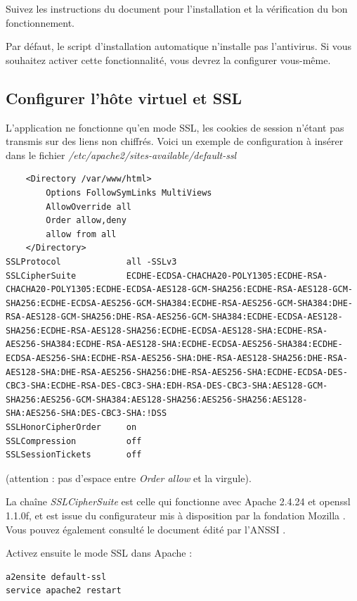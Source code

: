 Suivez les instructions du document \cite{clamavarchlinux} pour l'installation et la vérification du bon fonctionnement.

Par défaut, le script d'installation automatique n'installe pas l'antivirus. Si vous souhaitez activer cette fonctionnalité, vous devrez la configurer vous-même.

\subsection{Configurer l'hôte virtuel et SSL}
L'application ne fonctionne qu'en mode SSL, les cookies de session n'étant pas transmis sur des liens non chiffrés. Voici un exemple de configuration à insérer dans le fichier \textit{/etc/apache2/sites-available/default-ssl}
\begin{lstlisting}
    <Directory /var/www/html>
        Options FollowSymLinks MultiViews
        AllowOverride all
        Order allow,deny
        allow from all
    </Directory>
SSLProtocol             all -SSLv3
SSLCipherSuite          ECDHE-ECDSA-CHACHA20-POLY1305:ECDHE-RSA-CHACHA20-POLY1305:ECDHE-ECDSA-AES128-GCM-SHA256:ECDHE-RSA-AES128-GCM-SHA256:ECDHE-ECDSA-AES256-GCM-SHA384:ECDHE-RSA-AES256-GCM-SHA384:DHE-RSA-AES128-GCM-SHA256:DHE-RSA-AES256-GCM-SHA384:ECDHE-ECDSA-AES128-SHA256:ECDHE-RSA-AES128-SHA256:ECDHE-ECDSA-AES128-SHA:ECDHE-RSA-AES256-SHA384:ECDHE-RSA-AES128-SHA:ECDHE-ECDSA-AES256-SHA384:ECDHE-ECDSA-AES256-SHA:ECDHE-RSA-AES256-SHA:DHE-RSA-AES128-SHA256:DHE-RSA-AES128-SHA:DHE-RSA-AES256-SHA256:DHE-RSA-AES256-SHA:ECDHE-ECDSA-DES-CBC3-SHA:ECDHE-RSA-DES-CBC3-SHA:EDH-RSA-DES-CBC3-SHA:AES128-GCM-SHA256:AES256-GCM-SHA384:AES128-SHA256:AES256-SHA256:AES128-SHA:AES256-SHA:DES-CBC3-SHA:!DSS
SSLHonorCipherOrder     on
SSLCompression          off
SSLSessionTickets       off

\end{lstlisting}

(attention : pas d'espace entre \textit{Order allow} et la virgule).

La chaîne \textit{SSLCipherSuite} est celle qui fonctionne avec Apache 2.4.24 et openssl 1.1.0f, et est issue du configurateur mis à disposition par la fondation Mozilla \cite{mozillagenerator}. 
Vous pouvez également consulté le document édité par l'ANSSI \cite{tls}. 

Activez ensuite le mode SSL dans Apache :
\begin{lstlisting}
a2ensite default-ssl
service apache2 restart
\end{lstlisting}

